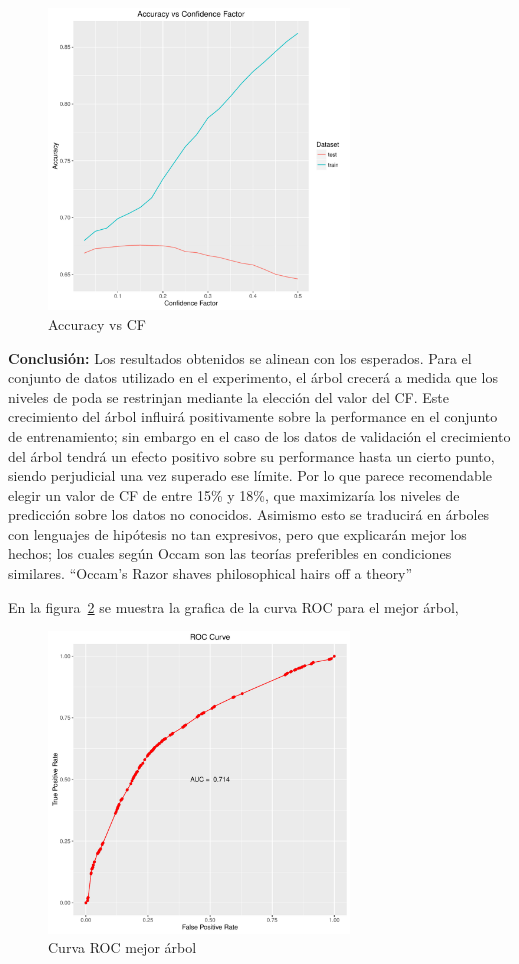 \begin{figure}
  \centering
  \includegraphics[width = 8cm]{3b.pdf}
  \caption{Accuracy vs CF}
  \label{fig:3b}
\end{figure}


\textbf{Conclusión:} Los resultados obtenidos se alinean con los esperados. Para el conjunto de
datos utilizado en el experimento, el árbol crecerá a medida que los niveles de poda se
restrinjan mediante la elección del valor del CF. Este crecimiento del árbol influirá
positivamente sobre la performance en el conjunto de entrenamiento; sin embargo en el caso
de los datos de validación el crecimiento del árbol tendrá un efecto positivo sobre su
performance hasta un cierto punto, siendo perjudicial una vez superado ese límite. Por lo
que parece recomendable elegir un valor de CF de entre 15\% y 18\%, que maximizaría los
niveles de predicción sobre los datos no conocidos. Asimismo esto se traducirá en árboles
con lenguajes de hipótesis no tan expresivos, pero que explicarán mejor los hechos; los
cuales según Occam son las teorías preferibles en condiciones similares.
``Occam’s Razor shaves philosophical hairs off a theory''




En la figura~\ref{fig:3c} se muestra la grafica de la curva ROC para el mejor árbol,

\begin{figure}
  \centering
  \includegraphics[width = 8cm]{3c.pdf}
  \caption{Curva ROC mejor árbol}
  \label{fig:3c}
\end{figure}


